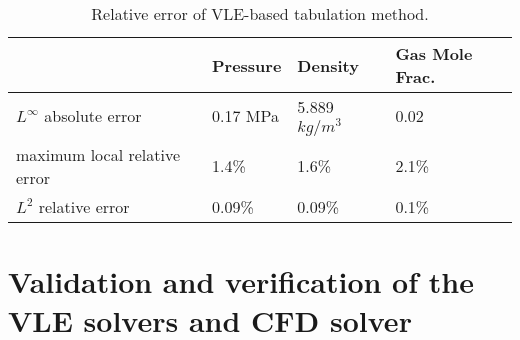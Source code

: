     \begin{table}[htbp]
        \centering
        \begin{minipage}{0.9\textwidth}
            \caption{Relative error of VLE-based tabulation method.} \label{table:error}
            \begin{center}
                \begin{tabular}{@{}l|lll@{}} %
                    \toprule
                                    &Pressure  & Density   & Gas Mole Frac.   \\ %
                    \midrule
                    $L^{\infty}$ absolute error           & 0.17 MPa        & 5.889 $kg/m^3$   & 0.02\\%
                    maximum local relative error          &  1.4\%           & 1.6\%   & 2.1\% \\ %
                     $L^2$ relative error               &  0.09\%           & 0.09\%   & 0.1\% \\ %
                    \bottomrule
                \end{tabular}

            \end{center}
        \end{minipage}

    \end{table}

    \section{Validation and verification of the VLE solvers and CFD solver} \label{App:vali}


